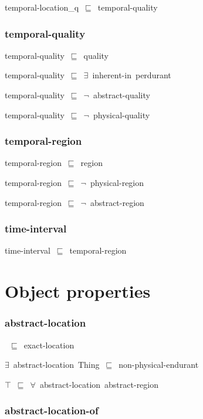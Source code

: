 \documentclass{article}
\begin{document}
temporal-location\_q~\ensuremath{\sqsubseteq}~temporal-quality~

\subsubsection*{temporal-quality}

temporal-quality~\ensuremath{\sqsubseteq}~quality~

temporal-quality~\ensuremath{\sqsubseteq}~\ensuremath{\exists}~inherent-in~perdurant~

temporal-quality~\ensuremath{\sqsubseteq}~\ensuremath{\lnot}~abstract-quality

temporal-quality~\ensuremath{\sqsubseteq}~\ensuremath{\lnot}~physical-quality

\subsubsection*{temporal-region}

temporal-region~\ensuremath{\sqsubseteq}~region~

temporal-region~\ensuremath{\sqsubseteq}~\ensuremath{\lnot}~physical-region

temporal-region~\ensuremath{\sqsubseteq}~\ensuremath{\lnot}~abstract-region

\subsubsection*{time-interval}

time-interval~\ensuremath{\sqsubseteq}~temporal-region~

\section*{Object properties}\subsubsection*{abstract-location}

~\ensuremath{\sqsubseteq}~exact-location

\ensuremath{\exists}~abstract-location~Thing~\ensuremath{\sqsubseteq}~non-physical-endurant

\ensuremath{\top}~\ensuremath{\sqsubseteq}~\ensuremath{\forall}~abstract-location~abstract-region

\subsubsection*{abstract-location-of}
\end{document}
